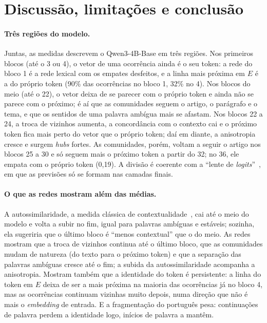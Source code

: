 \section{Discussão, limitações e conclusão}\label{sec:discussao}

\paragraph{Três regiões do modelo.} Juntas, as medidas descrevem o Qwen3-4B-Base em três
regiões. Nos primeiros blocos (até o 3 ou 4), o vetor de uma ocorrência ainda é o seu token: a
rede do bloco 1 é a rede lexical com os empates desfeitos, e a linha mais próxima em $E$ é a do
próprio token (90\% das ocorrências no bloco 1, 32\% no 4). Nos blocos do meio (até o 22), o
vetor deixa de se parecer com o próprio token e ainda não se parece com o próximo; é aí que as
comunidades seguem o artigo, o parágrafo e o tema, e que os sentidos de uma palavra ambígua
mais se afastam. Nos blocos 22 a 24, a troca de vizinhos aumenta, a concordância com o contexto
cai e o próximo token fica mais perto do vetor que o próprio token; daí em diante, a anisotropia
cresce e surgem \emph{hubs} fortes. As comunidades, porém, voltam a seguir o artigo nos blocos
25 a 30 e só seguem mais o próximo token a partir do 32; no 36, ele empata com o próprio token
(0,19). A divisão é coerente com a ``lente de
\emph{logits}''~\cite{nostalgebraist2020}, em que as previsões só se formam nas camadas finais.

\paragraph{O que as redes mostram além das médias.} A autossimilaridade, a medida clássica de
contextualidade~\cite{ethayarajh2019}, cai até o meio do modelo e volta a subir no fim, igual
para palavras ambíguas e estáveis; sozinha, ela sugeriria que o último bloco é ``menos
contextual'' que o do meio. As redes mostram que a troca de vizinhos continua até o último
bloco, que as comunidades mudam de natureza (do texto para o próximo token) e que a separação
das palavras ambíguas cresce até o fim; a subida da autossimilaridade acompanha a anisotropia.
Mostram também que a identidade do token é persistente: a linha do token em $E$ deixa de ser a
mais próxima na maioria das ocorrências já no bloco 4, mas as ocorrências continuam vizinhas muito depois, numa direção que
não é mais o \emph{embedding} de entrada. E a fragmentação do português pesa: continuações de
palavra perdem a identidade logo, inícios de palavra a mantêm.

